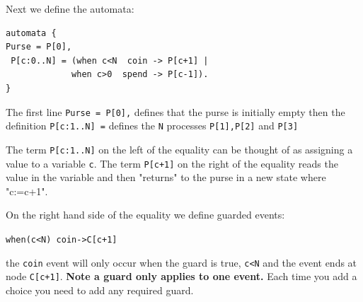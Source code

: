 \documentclass[]{article}
\begin{document}
Next  we define the automata:

\begin{center}\begin{minipage}{0.5\textwidth}
\begin{verbatim}
automata {
Purse = P[0],
 P[c:0..N] = (when c<N  coin -> P[c+1] |
             when c>0  spend -> P[c-1]).
}\end{verbatim}
\end{minipage}\end{center}

The first line \verb|Purse = P[0],| defines that the purse is initially empty then  the definition \verb$P[c:1..N] =$    defines the \verb$N$ processes \verb$P[1],P[2]$ and \verb$P[3]$


The term \verb$P[c:1..N]$ on the left of the equality can be thought of  as assigning a value to a variable \verb$c$. The term \verb$P[c+1]$  on the right of the equality reads the value in the variable and then  "returns" to the purse in a new state where "c:=c+1".

On the right hand side of the equality we define guarded events:
\begin{center}\verb$when(c<N) coin->C[c+1]$ \end{center}
the \verb$coin$ event  will only occur when the guard is true, \verb|c<N| and the event  ends at node \verb$C[c+1]$.  {\bf Note a guard  only applies to one event.}  Each time you add a choice you need to add any required  guard.
\end{document}

